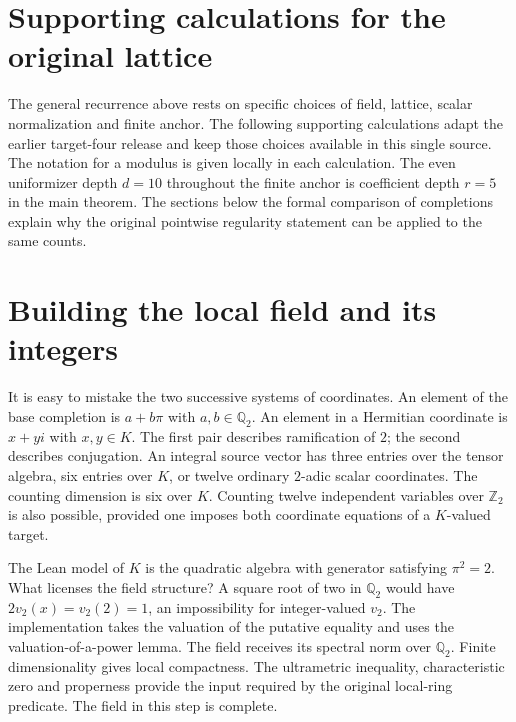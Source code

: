\documentclass[12pt,letterpaper]{article}
\begin{document}
\section{Supporting calculations for the original lattice}
The general recurrence above rests on specific choices of field, lattice, scalar normalization and finite anchor. The following supporting calculations adapt the earlier target-four release and keep those choices available in this single source. The notation for a modulus is given locally in each calculation. The even uniformizer depth $d=10$ throughout the finite anchor is coefficient depth $r=5$ in the main theorem. The sections below the formal comparison of completions explain why the original pointwise regularity statement can be applied to the same counts.
\section{Building the local field and its integers}
It is easy to mistake the two successive systems of coordinates. An element of the base completion is $a+b\pi$ with $a,b\in\mathbb Q_2$. An element in a Hermitian coordinate is $x+yi$ with $x,y\in K$. The first pair describes ramification of $2$; the second describes conjugation. An integral source vector has three entries over the tensor algebra, six entries over $K$, or twelve ordinary $2$-adic scalar coordinates. The counting dimension is six over $K$. Counting twelve independent variables over $\mathbb Z_2$ is also possible, provided one imposes both coordinate equations of a $K$-valued target.
\par
The Lean model of $K$ is the quadratic algebra with generator satisfying $\pi^2=2$. What licenses the field structure? A square root of two in $\mathbb Q_2$ would have $2v_2(x)=v_2(2)=1$, an impossibility for integer-valued $v_2$. The implementation takes the valuation of the putative equality and uses the valuation-of-a-power lemma. The field receives its spectral norm over $\mathbb Q_2$. Finite dimensionality gives local compactness. The ultrametric inequality, characteristic zero and properness provide the input required by the original local-ring predicate. The field in this step is complete.
\end{document}
